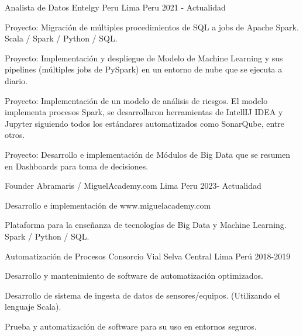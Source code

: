 

\begin{cventries}

  \cventry
    {Analista de Datos} %
    {Entelgy Peru} %
    {Lima Peru} %
    {2021 - Actualidad} %
    {
      \begin{cvitems} %
        \item {Proyecto: Migración de múltiples procedimientos de SQL a jobs de Apache Spark. Scala / Spark / Python / SQL.}
        \item {Proyecto: Implementación y despliegue de Modelo de Machine Learning y sus pipelines (múltiples jobs de PySpark) en un entorno de nube que se ejecuta a diario.}
        \item {Proyecto: Implementación de un modelo de análisis de riesgos. El modelo implementa procesos Spark, se desarrollaron herramientas de IntellIJ IDEA y Jupyter siguiendo todos los estándares automatizados como SonarQube, entre otros.}
        \item {Proyecto: Desarrollo e implementación de Módulos de Big Data que se resumen en Dashboards para toma de decisiones.}
      \end{cvitems}
    }

  \cventry
  {Founder} %
  {Abramaris / MiguelAcademy.com} %
  {Lima Peru} %
  {2023- Actualidad} %
  {
    \begin{cvitems} %
      \item {Desarrollo e implementación de www.miguelacademy.com}
      \item {Plataforma para la enseñanza de tecnologías de Big Data y Machine Learning. Spark / Python / SQL.}
    \end{cvitems}
  }
  \cventry
  {Automatización de Procesos} %
  {Consorcio Vial Selva Central} %
  {Lima Perú} %
  {2018-2019} %
  {
    \begin{cvitems} %
      \item {Desarrollo y mantenimiento de software de automatización optimizados.}
      \item {Desarrollo de sistema de ingesta de datos de sensores/equipos. (Utilizando el lenguaje Scala).}
      \item {Prueba y automatización de software para su uso en entornos seguros.}


\end{cvitems}}
\end{cventries}
